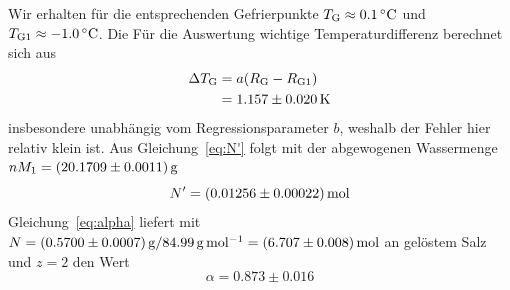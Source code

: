 Wir erhalten für die entsprechenden Gefrierpunkte $T_\mathrm{G} \approx \unit[0.1]{ ^\circ C}$ und $T_\mathrm{G1} \approx \unit[-1.0]{ ^\circ C}$. Die Für die Auswertung wichtige Temperaturdifferenz berechnet sich aus
\begin{align}
    \Delta T_\mathrm{G} &= a (R_\mathrm{G} - R_\mathrm{G1}) \label{eq:DT} \\
                        &= \unit[1.157 \pm 0.020]{K} \notag
\end{align} 
insbesondere unabhängig vom Regressionsparameter $b$, weshalb der Fehler hier relativ klein ist.
%
Aus Gleichung~\ref{eq:N'} folgt mit der abgewogenen Wassermenge $n M_1 = \unit[(20.1709 \pm 0.0011)]{g}$
\[
    N' = \unit[(0.01256 \pm 0.00022)]{mol}
\]
%
Gleichung~\ref{eq:alpha} liefert mit $N = \unit[(0.5700 \pm 0.0007)]{g} / \unit[84.99]{g\,mol^{-1}} = \unit[(6.707 \pm 0.008)]{mol}$ an gelöstem Salz und $z = 2$ den Wert 
\[
    \alpha = 0.873 \pm 0.016
\]










